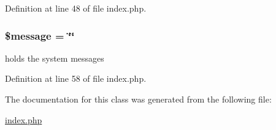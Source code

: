 Definition at line 48 of file index.\+php.

\subsubsection[{\texorpdfstring{\$message}{$message}}]{\setlength{\rightskip}{0pt plus 5cm}\${\bf message} = \char`\"{}\char`\"{}}\hypertarget{class_bms_1_1_bms_abf17cb2dba2ed17cb28aa5f37deb5293}{}\label{class_bms_1_1_bms_abf17cb2dba2ed17cb28aa5f37deb5293}
holds the system messages 

Definition at line 58 of file index.\+php.



The documentation for this class was generated from the following file\+:\begin{DoxyCompactItemize}
\item 
\hyperlink{index_8php}{index.\+php}\end{DoxyCompactItemize}

